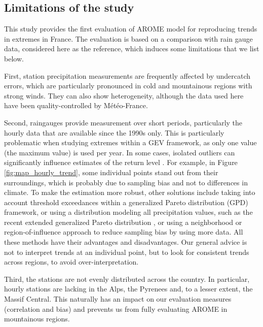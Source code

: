 \documentclass[hess, manuscript]{copernicus}
\begin{document}
\subsection{Limitations of the study}


This study provides the first evaluation of AROME model for reproducing trends in extremes in France. The evaluation is based on a comparison with rain gauge data, considered here as the reference, which induces some limitations that we list below.

First, station precipitation measurements are frequently affected by undercatch errors, which are particularly pronounced in cold and mountainous regions with strong winds. They can also show heterogeneity, although the data used here have been quality-controlled by Météo-France.

Second, raingauges provide measurement over short periods, particularly the hourly data that are available since the 1990s only. This is particularly problematic when studying extremes within a GEV framework, as only one value (the maximum value) is used per year. In some cases, isolated outliers can significantly influence estimates of the return level \citep{Zeder2024}. 
For example, in Figure \ref{fig:map_hourly_trend}, some individual points stand out from their surroundings, which is probably due to sampling bias and not to differences in climate. To make the estimation more robust, other solutions include taking into account threshold exceedances within a generalized Pareto distribution (GPD) framework, or using a distribution modeling all precipitation values, such as the recent extended generalized Pareto distribution \citep{haruna-etal-2025}, or using a neighborhood or region-of-influence approach \citep{blanchet2021explaining} to reduce sampling bias by using more data.
All these methods have their advantages and disadvantages. Our general advice is not to interpret trends at an individual point, but to look for consistent trends across regions, to avoid over-interpretation.

Third, the stations are not evenly distributed across the country. In particular, hourly stations are lacking in the Alps, the Pyrenees and, to a lesser extent, the Massif Central. This naturally has an impact on our evaluation measures (correlation and bias) and prevents us from fully evaluating AROME in mountainous regions.
\end{document}
